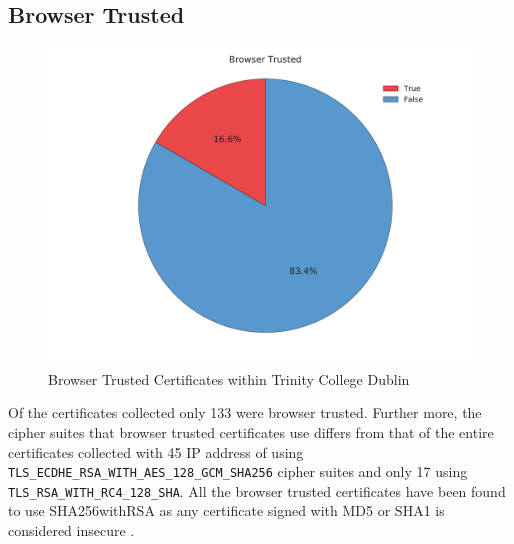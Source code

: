 \documentclass[a4wide,leqno,12pt]{report}
\begin{document}
\subsection{Browser Trusted}
\begin{figure}[H]
\centering
\includegraphics[scale=.5]{pdf_images/BrowserTrusted}
\caption{Browser Trusted Certificates within Trinity College Dublin}
\label{fig:browserTrusted}
\end{figure}
Of the certificates collected only 133 were browser trusted. Further more, the cipher suites that browser trusted certificates use differs from that of the entire certificates collected with 45 IP address of using\\ \texttt{TLS\_ECDHE\_RSA\_WITH\_AES\_128\_GCM\_SHA256} cipher suites and only 17 using \texttt{TLS\_RSA\_WITH\_RC4\_128\_SHA}. All the browser trusted certificates have been found to use SHA256withRSA as any certificate signed with MD5 or SHA1 is considered insecure \cite{ssllabs}.
\end{document}
